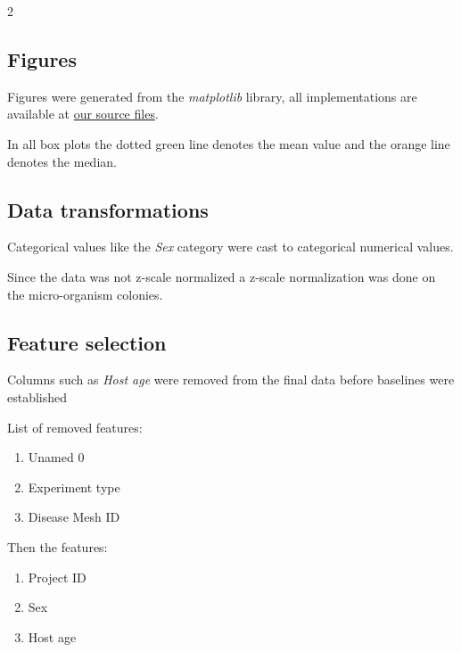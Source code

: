 \documentclass[12pt, a4paper]{article}
\begin{document}
\begin{multicols}{2}
    \subsection{Figures} \label{subsec:figs}

    Figures were generated from the \textit{matplotlib} \cite{noauthor_matplotlib_nodate} library, all implementations are available at \href{https://github.com/ArisPodotas/Assignment-1-MLICB/blob/main/src/functions.py}{our source files}.
    \newline

    In all box plots the dotted green line denotes the mean value and the orange line denotes the median.
    \newline

    \subsection{Data transformations} \label{subsec:transforms}

    Categorical values like the \textit{Sex} category were cast to categorical numerical values.
    \newline

    Since the data was not z-scale normalized a z-scale normalization was done on the micro-organism colonies.
    \newline

    \subsection{Feature selection} \label{subsec:fselect}

    Columns such as \textit{Host age} were removed from the final data before baselines were established
    \newline

    List of removed features:
    \newline

    \begin{enumerate} \label{enm:colms}
        \item Unamed 0
        \item Experiment type
        \item Disease Mesh ID
    \end{enumerate}

    Then the features:
    \newline

    \begin{enumerate} \label{enm:metadata}
        \item Project ID
        \item Sex
        \item Host age
    \end{enumerate}


\end{multicols}
\end{document}
